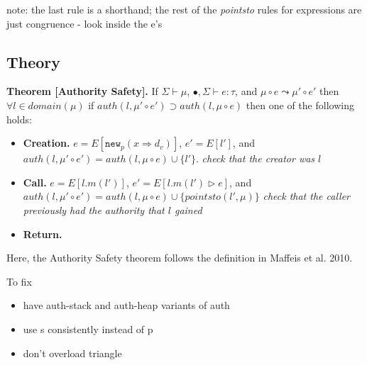 \documentclass{llncs}
\newcommand{\keywadj}[1]{\mathtt{#1}}
\newcommand{\stepsto}{\leadsto}
\begin{document}
note: the last rule is a shorthand; the rest of the \textit{pointsto} rules for expressions are just congruence - look inside the e's


\newpage

\subsection{Theory}

\textbf{Theorem [Authority Safety].}  If $\Sigma \vdash \mu$, $\bullet, \Sigma \vdash e : \tau$, and $\mu \circ e \stepsto \mu' \circ e'$ then $\forall l \in domain(\mu)$ if $auth(l,\mu' \circ e') \supset auth(l,\mu \circ e)$ then one of the following holds:

\begin{itemize}
  \item \textbf{Creation.} $e = E[\keywadj{new}_p(x \Rightarrow d_v)]$, $e' = E[l']$, and $auth(l,\mu' \circ e') = auth(l,\mu \circ e) \cup \{ l' \}$.  \textit{check that the creator was $l$}
  \item \textbf{Call.} $e = E[l.m(l')]$, $e' = E[l.m(l') \rhd e]$, and $auth(l,\mu' \circ e') = auth(l,\mu \circ e) \cup \{ pointsto(l',\mu) \}$  \textit{check that the caller previously had the authority that $l$ gained}
  \item \textbf{Return.}
\end{itemize}

Here, the Authority Safety theorem follows the definition in Maffeis et al. 2010.

To fix

\begin{itemize}
  \item have auth-stack and auth-heap variants of auth
  \item use s consistently instead of p
  \item don't overload triangle
\end{itemize}
\end{document}
